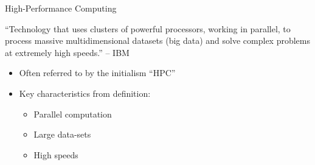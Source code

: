 \documentclass[10pt,aspectratio=169]{beamer}
\begin{document}
\begin{frame}{High-Performance Computing}
    \begin{displayquote}
        \vspace{0.2cm}
        ``Technology that uses clusters of powerful processors, working in parallel, to process massive multidimensional datasets (big data) and solve complex problems at extremely high speeds.'' -- IBM \cite{WhatHPCIntroduction}
    \end{displayquote}
    \vspace*{0.25cm}
    \begin{itemize}
        \item Often referred to by the initialism ``HPC''
        \item Key characteristics from definition:
        \begin{itemize}
            \item Parallel computation
            \item Large data-sets
            \item \alert{High speeds}
        \end{itemize}
    \end{itemize}
\end{frame}
\end{document}

